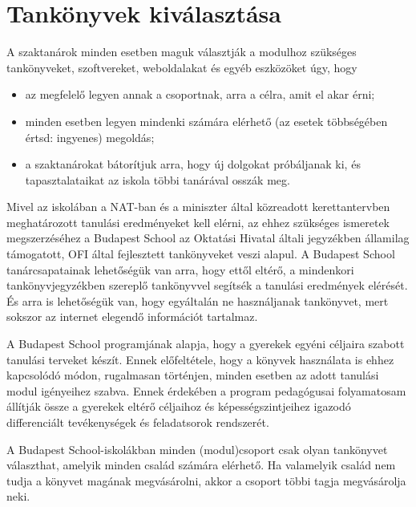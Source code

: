 \hypertarget{tankonyvek-kivalasztasa}{%
\section{Tankönyvek kiválasztása}\label{tankonyvek-kivalasztasa}}

A szaktanárok minden esetben maguk választják a modulhoz szükséges
tankönyveket, szoftvereket, weboldalakat és egyéb eszközöket úgy, hogy

\begin{itemize}
\item
  az megfelelő legyen annak a csoportnak, arra a célra, amit el akar
  érni;
\item
  minden esetben legyen mindenki számára elérhető (az esetek többségében
  értsd: ingyenes) megoldás;
\item
  a szaktanárokat bátorítjuk arra, hogy új dolgokat próbáljanak ki,
  és tapasztalataikat az iskola többi tanárával osszák meg.
\end{itemize}

Mivel az iskolában a NAT-ban és a miniszter által közreadott kerettantervben
meghatározott tanulási eredményeket kell elérni, az ehhez szükséges
ismeretek megszerzéséhez a Budapest School az Oktatási Hivatal általi
jegyzékben államilag támogatott, OFI által fejlesztett tankönyveket
veszi alapul. A Budapest School tanárcsapatainak lehetőségük van arra,
hogy ettől eltérő, a mindenkori tankönyvjegyzékben szereplő tankönyvvel
segítsék a tanulási eredmények elérését. És arra is lehetőségük van, hogy
egyáltalán ne használjanak tankönyvet, mert sokszor az internet elegendő
információt tartalmaz.

A Budapest School programjának alapja, hogy a gyerekek egyéni céljaira
szabott tanulási terveket készít. Ennek előfeltétele, hogy a könyvek
használata is ehhez kapcsolódó módon, rugalmasan történjen, minden
esetben az adott tanulási modul igényeihez szabva. Ennek érdekében a
program pedagógusai folyamatosam állítják össze a gyerekek eltérő
céljaihoz és képességszintjeihez igazodó differenciált tevékenységek és
feladatsorok rendszerét.

A Budapest School-iskolákban minden (modul)csoport csak olyan\break
tankönyvet választhat, amelyik minden család számára elérhető. Ha valamelyik család
nem tudja a könyvet magának megvásárolni, akkor a csoport többi tagja
megvásárolja neki.
